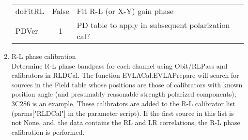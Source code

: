 \documentclass[11pt]{article}
\begin{document}
\begin{enumerate}
\begin{center}
\begin{tabular}{|l|c|l|}
doFitRL   & False  &  Fit R-L (or X-Y) gain phase\\
PDVer     & 1      &  PD table to apply in subsequent polarization cal?\\
\hline
\end{tabular}
\end{center}
%
\newpage
\item R-L phase calibration\\
Determine R-L phase bandpass for each channel using Obit/RLPass
and calibrators in RLDCal.
The function EVLACal.EVLAPrepare will search for sources in the Field
table whose positions are those of calibrators with known position
angle (and presumably reasonable strength polarized components);
3C286 is an example.
These calibrators are added to the R-L calibrator list (parms["RLDCal"]
in the parameter script).
If the first source in this list is not None, and, the data contains
the RL and LR correlations, the R-L phase calibration is performed. 


\end{enumerate}
\end{document}
